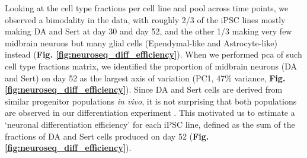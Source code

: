 Looking at the cell type fractions per cell line and pool across time points, we observed a bimodality in the data, with roughly 2/3 of the iPSC lines mostly making DA and Sert at day 30 and day 52, and the other 1/3 making very few midbrain neurons but many glial cells (Ependymal-like and Astrocyte-like) instead (\textbf{Fig. \ref{fig:neuroseq_diff_efficiency}}).
When we performed \gls{pca} of such cell type fractions matrix, we identified the proportion of midbrain neurons (DA and Sert) on day 52 as the largest axis of variation (PC1, 47\% variance, \textbf{Fig. \ref{fig:neuroseq_diff_efficiency}}). 
Since DA and Sert cells are derived from similar progenitor populations \textit{in vivo}, it is not surprising that both populations are observed in our differentiation experiment \cite{ye1998fgf, cao2017characterization}. 
This motivated us to estimate a `neuronal differentiation efficiency' for each iPSC line, defined as the sum of the fractions of DA and Sert cells produced on day 52 (\textbf{Fig. \ref{fig:neuroseq_diff_efficiency}}). 

